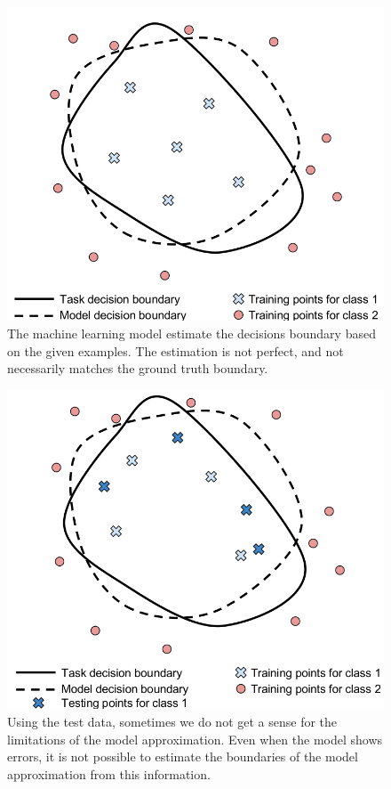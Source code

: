   \begin{figure}
    \centering
    \includegraphics[scale=0.3]{images/adv_attack/gen_er2.png}
    \caption{The machine learning model estimate the decisions boundary based on the given examples. The estimation is not perfect, and not necessarily matches the ground truth boundary.}
    \label{fig:gen_er2}
  \end{figure}

  \begin{figure}
    \centering
    \includegraphics[scale=0.3]{images/adv_attack/gen_er3.png}
    \caption{Using the test data, sometimes we do not get a sense for the limitations of the model approximation. Even when the model shows errors, it is not possible to estimate the boundaries of the model approximation from this information.}
    \label{fig:gen_er3}
  \end{figure}

